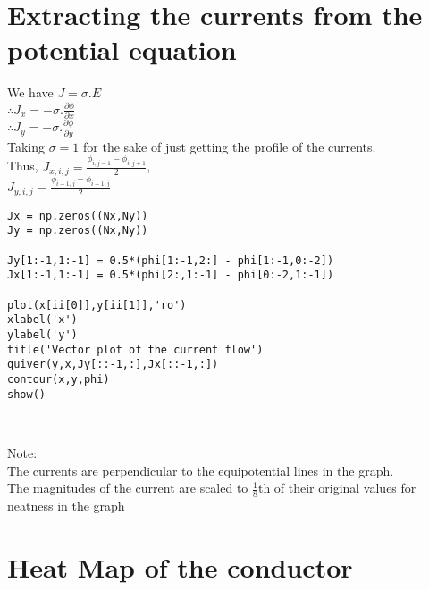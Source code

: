 \documentclass[11pt]{article}
\begin{document}
    \begin{center}
    \end{center}
    { \hspace*{\fill} \\}
    
    \hypertarget{extracting-the-currents-from-the-potential-equation}{%
\section{Extracting the currents from the potential
equation}\label{extracting-the-currents-from-the-potential-equation}}

We have \(J=\sigma.E\)\\
\(\therefore J_{x}=-\sigma.\frac{\partial{\phi}}{\partial{x}}\)\\
\(\therefore J_{y}=-\sigma.\frac{\partial{\phi}}{\partial{y}}\)\\ Taking
\(\sigma=1\) for the sake of just getting the profile of the currents.\\
Thus, \(J_{x,i,j}=\frac{\phi_{i,j-1}-\phi_{i,j+1}}{2}\),\\
\(J_{y,i,j}=\frac{\phi_{i-1,j}-\phi_{i+1,j}}{2}\)

    \begin{Verbatim}
Jx = np.zeros((Nx,Ny))
Jy = np.zeros((Nx,Ny))

Jy[1:-1,1:-1] = 0.5*(phi[1:-1,2:] - phi[1:-1,0:-2])
Jx[1:-1,1:-1] = 0.5*(phi[2:,1:-1] - phi[0:-2,1:-1])

plot(x[ii[0]],y[ii[1]],'ro')
xlabel('x')
ylabel('y')
title('Vector plot of the current flow')
quiver(y,x,Jy[::-1,:],Jx[::-1,:])
contour(x,y,phi)
show()
\end{Verbatim}


    \begin{center}
    \end{center}
    { \hspace*{\fill} \\}
    
Note:\\ The currents are perpendicular to the equipotential lines in the
graph.\\The magnitudes of the current are scaled to \(\frac{1}{8}\)th
of their original values for neatness in the graph

    \hypertarget{heat-map-of-the-conductor}{%
\section{Heat Map of the conductor}\label{heat-map-of-the-conductor}}
\end{document}

